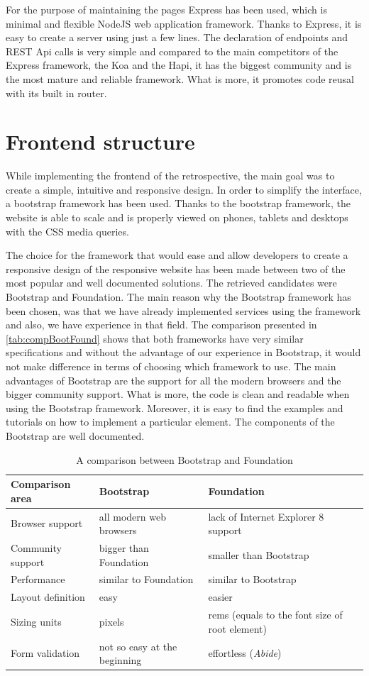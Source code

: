For the purpose of maintaining the pages Express has been used, which is minimal and flexible NodeJS web application framework. Thanks to Express, it is easy to create a server using just a few lines. The declaration of endpoints and REST Api calls is very simple and compared to the main competitors of the Express framework, the Koa and the Hapi, it has the biggest community and is the most mature and reliable framework. What is more, it promotes code reusal with its built in router.

\section{Frontend structure}

While implementing the frontend of the retrospective, the main goal was to create a simple, intuitive and responsive design. In order to simplify the interface, a bootstrap framework has been used. Thanks to the bootstrap framework, the website is able to scale and is properly viewed on phones, tablets and desktops with the CSS media queries.

The choice for the framework that would ease and allow developers to create a responsive design of the responsive website has been made between two of the most popular and well documented solutions. The retrieved candidates were Bootstrap and Foundation. The main reason why the Bootstrap framework has been chosen, was that we have already implemented services using the framework and also, we have experience in that field. The comparison presented in \autoref{tab:compBootFound} shows that both frameworks have very similar specifications and without the advantage of our experience in Bootstrap, it would not make difference in terms of choosing which framework to use. The main advantages of Bootstrap are the support for all the modern browsers and the bigger community support. What is more, the code is clean and readable when using the Bootstrap framework. Moreover, it is easy to find the examples and tutorials on how to implement a particular element. The components of the Bootstrap are well documented.

\begin{table}[ht!]
\caption{A comparison between Bootstrap and Foundation}
\label{tab:compBootFound}
\begin{tabularx}{\textwidth}{|X|X|X|}
\hline
\textbf{Comparison area} & \textbf{Bootstrap} & \textbf{Foundation}  \\ \hline
Browser support & all modern web browsers & lack of Internet Explorer 8 support \\ \hline
Community support & bigger than Foundation & smaller than Bootstrap \\ \hline
Performance & similar to Foundation & similar to Bootstrap \\ \hline
Layout definition & easy & easier \\ \hline
Sizing units & pixels & rems (equals to the font size of root element)\\ \hline
Form validation & not so easy at the beginning & effortless (\textit{Abide}) \\ \hline
\end{tabularx}
\end{table}

